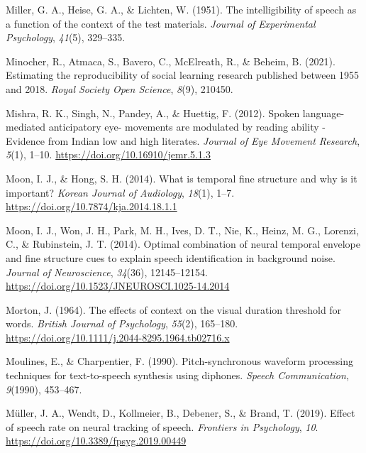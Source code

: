 \documentclass[a4paper, nobind]{templates/ociamthesis}
\newlength{\cslhangindent}
\newenvironment{CSLReferences}[2] %
 {%
  \setlength{\parindent}{0pt}
  \ifodd #1
  \let\oldpar\par
  \def\par{\hangindent=\cslhangindent\oldpar}
  \fi
  \setlength{\parskip}{1mm}
  \setlength{\baselineskip}{6mm}
 }%
 {}
\begin{document}
\begin{CSLReferences}{1}{0}
\leavevmode{}%
Miller, G. A., Heise, G. A., \& Lichten, W. (1951). {The intelligibility of speech as a function of the context of the test materials}. \emph{Journal of Experimental Psychology}, \emph{41}(5), 329--335.

\leavevmode{}%
Minocher, R., Atmaca, S., Bavero, C., McElreath, R., \& Beheim, B. (2021). Estimating the reproducibility of social learning research published between 1955 and 2018. \emph{Royal Society Open Science}, \emph{8}(9), 210450.

\leavevmode{}%
Mishra, R. K., Singh, N., Pandey, A., \& Huettig, F. (2012). {Spoken language-mediated anticipatory eye- movements are modulated by reading ability - Evidence from Indian low and high literates}. \emph{Journal of Eye Movement Research}, \emph{5}(1), 1--10. \url{https://doi.org/10.16910/jemr.5.1.3}

\leavevmode{}%
Moon, I. J., \& Hong, S. H. (2014). What is temporal fine structure and why is it important? \emph{Korean Journal of Audiology}, \emph{18}(1), 1--7. \url{https://doi.org/10.7874/kja.2014.18.1.1}

\leavevmode{}%
Moon, I. J., Won, J. H., Park, M. H., Ives, D. T., Nie, K., Heinz, M. G., Lorenzi, C., \& Rubinstein, J. T. (2014). Optimal combination of neural temporal envelope and fine structure cues to explain speech identification in background noise. \emph{Journal of Neuroscience}, \emph{34}(36), 12145--12154. \url{https://doi.org/10.1523/JNEUROSCI.1025-14.2014}

\leavevmode{}%
Morton, J. (1964). {The effects of context on the visual duration threshold for words}. \emph{British Journal of Psychology}, \emph{55}(2), 165--180. \url{https://doi.org/10.1111/j.2044-8295.1964.tb02716.x}

\leavevmode{}%
Moulines, E., \& Charpentier, F. (1990). {Pitch-synchronous waveform processing techniques for text-to-speech synthesis using diphones}. \emph{Speech Communication}, \emph{9}(1990), 453--467.

\leavevmode{}%
Müller, J. A., Wendt, D., Kollmeier, B., Debener, S., \& Brand, T. (2019). {Effect of speech rate on neural tracking of speech}. \emph{Frontiers in Psychology}, \emph{10}. \url{https://doi.org/10.3389/fpsyg.2019.00449}


\end{CSLReferences}
\end{document}

